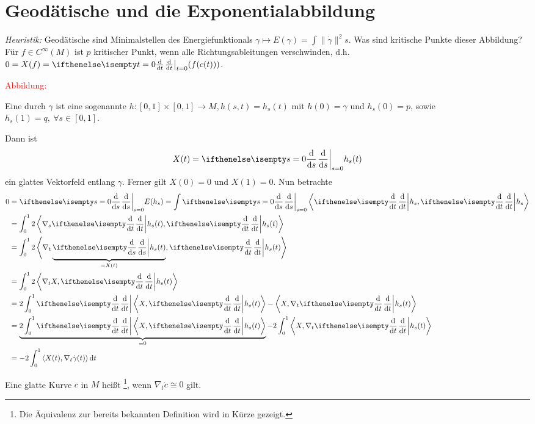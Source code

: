

\chapter{Geodätische und die Exponentialabbildung}

\textit{Heuristik:} Geodätische sind Minimalstellen des Energiefunktionals $\gamma \mapsto E(\gamma) = \int \|\dot\gamma\|^2s$. 
Was sind kritische Punkte dieser Abbildung? Für $f \in C^{\infty}(M)$ ist $p$ kritischer Punkt, wenn alle Richtungsableitungen verschwinden, d.h. $0 = X(f) = \difffrac[t=0]{}{t}(f(c(t)))$.

\begin{center}
  \textcolor{red}{Abbildung: }
\end{center}

Eine  durch $\gamma$ ist eine sogenannte  $h\colon[0,1]\times[0,1] \to M, h(s,t) = h_s(t)$ mit $h(0) = \gamma$ und $h_s(0) = p$, sowie $h_s(1) = q, \ \forall s \in [0,1]$.

Dann ist
\begin{align*}
  X(t) = \difffrac[s=0]{}{s}h_s(t)
\end{align*}
ein glattes Vektorfeld entlang $\gamma$.
Ferner gilt $X(0) = 0$ und $X(1) = 0$.
Nun betrachte
\begin{align*}
  0 & = \difffrac[s=0]{}{s}E(h_s) = \int \difffrac[s=0]{}{s} \left<\difffrac{}{t} h_s,\difffrac{}{t}h_s\right>\\
  & = \int_0^1 2 \left<\nabla_s \difffrac{}{t}h_s(t), \difffrac{}{t}h_s(t)\right>\\
& = \int_0^1 2 \left<\nabla_t\underbrace{\difffrac{}{s}h_s(t)}_{=X(t)}, \difffrac{}{t}h_s(t)\right>\\
& = \int_0^1 2 \left<\nabla_tX,\difffrac{}{t}h_s(t)\right>\\
& = 2 \int_0^1 \difffrac{}{t}\left<X,\difffrac{}{t}h_s(t)\right> - \left<X,\nabla_t\difffrac{}{t}h_s(t)\right>\\
& = \underbrace{2 \int_0^1 \difffrac{}{t}\left<X,\difffrac{}{t}h_s(t)\right>}_{=0} - 2 \int_0^1 \left<X,\nabla_t\difffrac{}{t}h_s(t)\right>\\
& = -2 \int_0^1 \left<X(t),\nabla_t\dot\gamma(t)\right>\dop t
\end{align*}

\begin{Dfn}
  Eine glatte Kurve $c$ in $M$ heißt \footnote{Die Äquivalenz zur bereits bekannten Definition wird in Kürze gezeigt.}, wenn $\nabla_t\dot c \cong 0$ gilt.
\end{Dfn}

